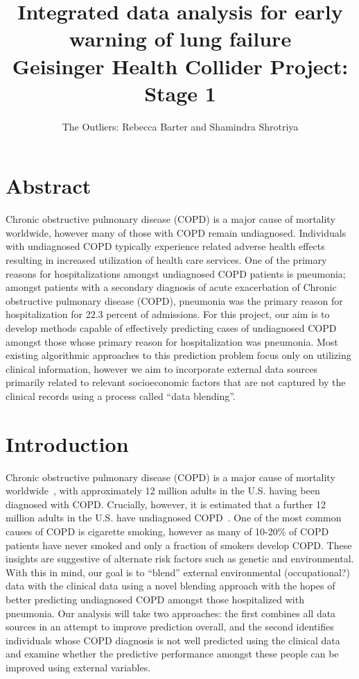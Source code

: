 \documentclass{article}
\title{Integrated data analysis for early warning of lung failure \\ \large{Geisinger Health Collider Project: Stage 1}}
\author{The Outliers: Rebecca Barter and Shamindra Shrotriya}
\begin{document}
\maketitle


\section{Abstract}


Chronic obstructive pulmonary disease (COPD) is a major cause of mortality worldwide, however many of those with COPD remain undiagnosed. Individuals with undiagnosed COPD typically experience related adverse health effects resulting in increased utilization of health care services. One of the primary reasons for hospitalizations amongst undiagnosed COPD patients is pneumonia; amongst patients with a secondary diagnosis of acute exacerbation of Chronic obstructive pulmonary disease (COPD), pneumonia was the primary reason for hospitalization for 22.3 percent of admissions. For this project, our aim is to develop methods capable of effectively predicting cases of undiagnosed COPD amongst those whose primary reason for hospitalization was pneumonia. Most existing algorithmic approaches to this prediction problem focus only on utilizing clinical information, however we aim to incorporate external data sources primarily related to relevant socioeconomic factors that are not captured by the clinical records using a process called ``data blending''. 


\section{Introduction}


Chronic obstructive pulmonary disease (COPD) is a major cause of mortality worldwide~\cite{lozano_global_2012}, with approximately 12 million adults in the U.S. having been diagnosed with COPD. Crucially, however, it is estimated that a further 12 million adults in the U.S. have undiagnosed COPD~\cite{nih_chronic_2010}. One of the most common causes of COPD is cigarette smoking, however as many of 10-20\% of COPD patients have never smoked and only a fraction of smokers develop COPD. These insights are suggestive of alternate risk factors such as genetic and environmental. With this in mind, our goal is to ``blend'' external environmental (occupational?) data with the clinical data using a novel blending approach with the hopes of better predicting undiagnosed COPD amongst those hospitalized with pneumonia. Our analysis will take two approaches: the first combines all data sources in an attempt to improve prediction overall, and the second identifies individuals whose COPD diagnosis is not well predicted using the clinical data and examine whether the predictive performance amongst these people can be improved using external variables. 
\end{document}
